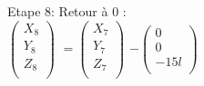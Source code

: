 Etape 8: Retour à 0 : \\

$
\begin{pmatrix}
  X_{8} \\
  Y_{8} \\
  Z_{8} \\
\end{pmatrix}
$
\vspace{5mm} %
$
=
\begin{pmatrix}
  X_{7} \\
  Y_{7} \\
  Z_{7} \\
\end{pmatrix}
$
\vspace{5mm} %
$
 -
\begin{pmatrix}
  0  \\
  0 \\
  -15l \\
\end{pmatrix}
$
